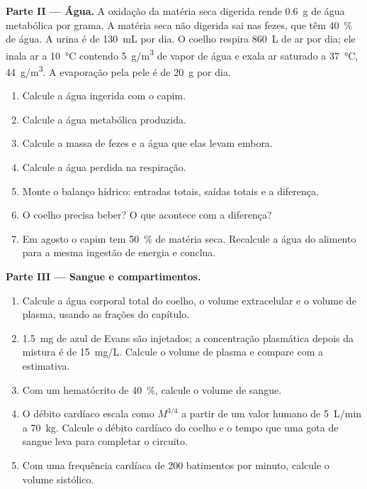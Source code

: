 \begin{problem}
\medskip
\noindent\textbf{Parte II --- Água.}
A oxidação da matéria seca digerida rende \qty{0.6}{g} de água
metabólica por grama. A matéria seca não digerida sai nas fezes, que
têm \qty{40}{\%} de água. A urina é de \qty{130}{mL} por dia. O coelho
respira \qty{860}{L} de ar por dia; ele inala ar a \qty{10}{\celsius}
contendo \qty{5}{g/m^3} de vapor de água e exala ar saturado a
\qty{37}{\celsius}, \qty{44}{g/m^3}. A evaporação pela pele é de
\qty{20}{g} por dia.
\begin{enumerate}[resume]
  \item Calcule a água ingerida com o capim.
  \item Calcule a água metabólica produzida.
  \item Calcule a massa de fezes e a água que elas levam embora.
  \item Calcule a água perdida na respiração.
  \item Monte o balanço hídrico: entradas totais, saídas totais e a
        diferença.
  \item O coelho precisa beber? O que acontece com a diferença?
  \item Em agosto o capim tem \qty{50}{\%} de matéria seca. Recalcule a
        água do alimento para a mesma ingestão de energia e conclua.
\end{enumerate}

\medskip
\noindent\textbf{Parte III --- Sangue e compartimentos.}
\begin{enumerate}[resume]
  \item Calcule a água corporal total do coelho, o volume extracelular e
        o volume de plasma, usando as frações do capítulo.
  \item \qty{1.5}{mg} de azul de Evans são injetados; a concentração
        plasmática depois da mistura é de \qty{15}{mg/L}. Calcule o
        volume de plasma e compare com a estimativa.
  \item Com um hematócrito de \qty{40}{\%}, calcule o volume de sangue.
  \item O débito cardíaco escala como $M^{3/4}$ a partir de um valor
        humano de \qty{5}{L/min} a \qty{70}{kg}. Calcule o débito
        cardíaco do coelho e o tempo que uma gota de sangue leva para
        completar o circuito.
  \item Com uma frequência cardíaca de \qty{200}{} batimentos por
        minuto, calcule o volume sistólico.
\end{enumerate}


\end{problem}
